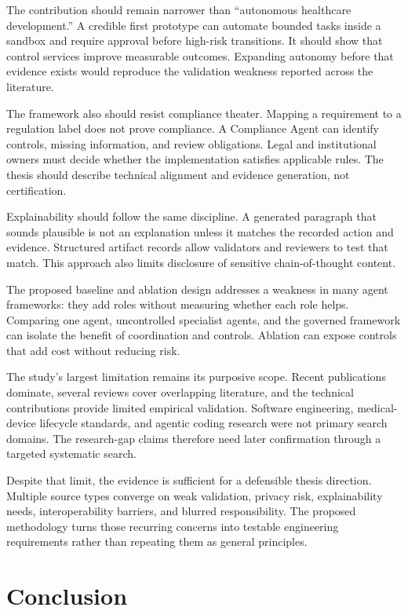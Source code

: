 \documentclass[11pt,a4paper]{article}
\begin{document}
The contribution should remain narrower than ``autonomous healthcare development.'' A credible first prototype can automate bounded tasks inside a sandbox and require approval before high-risk transitions. It should show that control services improve measurable outcomes. Expanding autonomy before that evidence exists would reproduce the validation weakness reported across the literature.

The framework also should resist compliance theater. Mapping a requirement to a regulation label does not prove compliance. A Compliance Agent can identify controls, missing information, and review obligations. Legal and institutional owners must decide whether the implementation satisfies applicable rules. The thesis should describe technical alignment and evidence generation, not certification.

Explainability should follow the same discipline. A generated paragraph that sounds plausible is not an explanation unless it matches the recorded action and evidence. Structured artifact records allow validators and reviewers to test that match. This approach also limits disclosure of sensitive chain-of-thought content.

The proposed baseline and ablation design addresses a weakness in many agent frameworks: they add roles without measuring whether each role helps. Comparing one agent, uncontrolled specialist agents, and the governed framework can isolate the benefit of coordination and controls. Ablation can expose controls that add cost without reducing risk.

The study's largest limitation remains its purposive scope. Recent publications dominate, several reviews cover overlapping literature, and the technical contributions provide limited empirical validation. Software engineering, medical-device lifecycle standards, and agentic coding research were not primary search domains. The research-gap claims therefore need later confirmation through a targeted systematic search.

Despite that limit, the evidence is sufficient for a defensible thesis direction. Multiple source types converge on weak validation, privacy risk, explainability needs, interoperability barriers, and blurred responsibility. The proposed methodology turns those recurring concerns into testable engineering requirements rather than repeating them as general principles.

\section{Conclusion}
\end{document}
